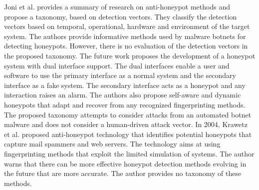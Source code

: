 \documentclass[../main.tex]{subfiles}
\begin{document}
Joni et al. \cite{Joni} provides a  summary of research on anti-honeypot methods and propose a taxonomy, based on detection vectors. They classify the detection vectors based on temporal, operational, hardware and environment of the target system. The authors provide informative methods used by malware botnets for detecting honeypots. However, there is no evaluation of the detection vectors in the proposed taxonomy. The future work proposes the development of a honeypot system with dual interface support. The dual interfaces enable a user and software to use the primary interface as a normal system and the secondary interface as a fake system. The secondary interface acts as a honeypot and any interaction raises an alarm. The authors also propose self-aware and dynamic honeypots that adapt and recover from any recognized fingerprinting methods. The proposed taxonomy attempts to consider attacks from an automated botnet malware and does not consider a human-driven attack vector. In 2004, Krawetz et al. \cite{krawetz2004anti} proposed anti-honeypot technology that identifies potential honeypots that capture mail spammers and web servers. The technology aims at using fingerprinting methods that exploit the limited simulation of systems. The author warns that there can be more effective honeypot detection methods evolving in the future that are more accurate. The author provides no taxonomy of these methods. 
\end{document}
